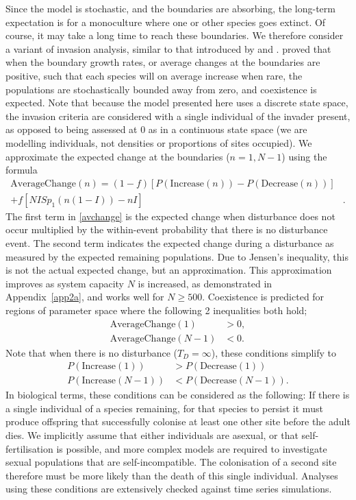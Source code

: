 Since the model is stochastic, and the boundaries are absorbing, the long-term expectation is for a monoculture where one or other species goes extinct. Of course, it may take a long time to reach these boundaries. We therefore consider a variant of invasion analysis, similar to that introduced by \cite{chesson1989invasibility} and \cite{ellner1989convergence}. \cite{chesson1982stabilizing} proved that when the boundary growth rates, or average changes at the boundaries are positive, such that each species will on average increase when rare, the populations are stochastically bounded away from zero, and coexistence is expected. Note that because the model presented here uses a discrete state space, the invasion criteria are considered with a single individual of the invader present, as opposed to being assessed at 0 as in a continuous state space (we are modelling individuals, not densities or proportions of sites occupied). We approximate the expected change at the boundaries ($n=1,N-1$) using the formula
\begin{equation}
\label{avchange}
\begin{array}{rl}
\text{AverageChange}(n) = (1-f)\left[P(\text{Increase}(n))-P(\text{Decrease}(n))\right]&\\[0.75em]
+ f\left[ NI Sp_1(n(1-I)) - nI\right]&.
\end{array}
\end{equation}
The first term in \eqref{avchange} is the expected change when disturbance does not occur multiplied by the within-event probability that there is no disturbance event. The second term indicates the expected change during a disturbance as measured by the expected remaining populations. Due to Jensen's inequality, this is not the actual expected change, but an approximation. This approximation improves as system capacity $N$ is increased, as demonstrated in Appendix~\ref{app2a}, and works well for $N\geq500$. Coexistence is predicted for regions of parameter space where the following 2 inequalities both hold;
\begin{align}
\label{ac1}\text{AverageChange}(1)&>0, \\
\label{acn-1}\text{AverageChange}(N-1)&<0. \end{align}
Note that when there is no disturbance ($T_D=\infty$), these conditions simplify to 
\begin{align}
\label{lowerboundarycond}P(\text{Increase}(1))&>P(\text{Decrease}(1)) \\
\label{upperboundarycond}P(\text{Increase}(N-1))&<P(\text{Decrease}(N-1)). \end{align}
In biological terms, these conditions can be considered as the following: If there is a single individual of a species remaining, for that species to persist it must produce offspring that successfully colonise at least one other site before the adult dies. We implicitly assume that either individuals are asexual, or that self-fertilisation is possible, and more complex models are required to investigate sexual populations that are self-incompatible. The colonisation of a second site therefore must be more likely than the death of this single individual. Analyses using these conditions are extensively checked against time series simulations.

